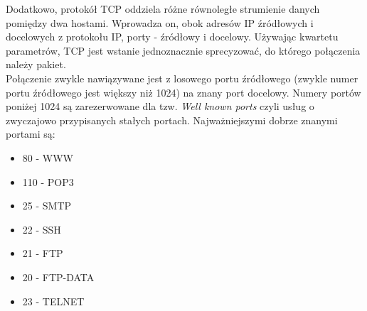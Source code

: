 \documentclass[a4paper,12pt,oneside]{book}
\begin{document}
			Dodatkowo, protokół TCP oddziela różne równoległe strumienie danych pomiędzy dwa hostami.
			Wprowadza on, obok adresów IP źródłowych i docelowych z protokołu IP, porty - źródłowy i docelowy.
			Używając kwartetu parametrów, TCP jest wstanie jednoznacznie sprecyzować, do którego połączenia należy pakiet.\\
			Połączenie zwykle nawiązywane jest z losowego portu źródłowego (zwykle numer portu źródłowego jest większy niż 1024) na znany port docelowy.
			Numery portów poniżej 1024 są zarezerwowane dla tzw. \textit{Well known ports} czyli usług o zwyczajowo przypisanych stałych portach.
			Najważniejszymi dobrze znanymi portami są:
			\begin{itemize}
				\item 80 - WWW
				\item 110 - POP3
				\item 25 - SMTP
				\item 22 - SSH
				\item 21 - FTP
				\item 20 - FTP-DATA
				\item 23 - TELNET
			\end{itemize}
\end{document}
